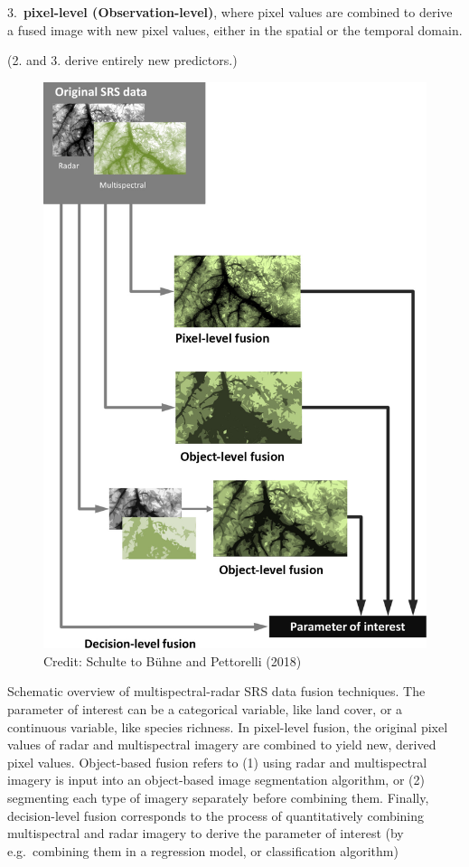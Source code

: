 \documentclass[
  letterpaper,
  DIV=11,
  numbers=noendperiod]{scrreprt}
\begin{document}
3.~\textbf{pixel-level (Observation-level)}, where pixel values are
combined to derive a fused image with new pixel values, either in the
spatial or the temporal domain.

(2. and 3. derive entirely new predictors.)

\begin{figure}

{\centering \includegraphics{./images/fusion techniques.png}

}

\caption{\label{fig-fusiontech}Credit: Schulte to Bühne and Pettorelli
(2018)}

\end{figure}

Schematic overview of multispectral-radar SRS data fusion techniques.
The parameter of interest can be a categorical variable, like land
cover, or a continuous variable, like species richness. In pixel-level
fusion, the original pixel values of radar and multispectral imagery are
combined to yield new, derived pixel values. Object-based fusion refers
to (1) using radar and multispectral imagery is input into an
object-based image segmentation algorithm, or (2) segmenting each type
of imagery separately before combining them. Finally, decision-level
fusion corresponds to the process of quantitatively combining
multispectral and radar imagery to derive the parameter of interest (by
e.g.~combining them in a regression model, or classification algorithm)
\end{document}
